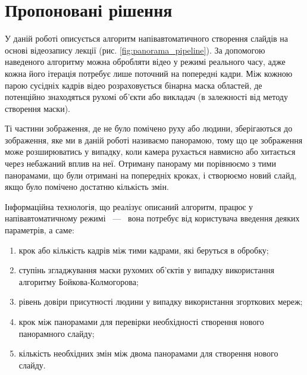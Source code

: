 \section{Пропоновані рішення}

У даній роботі описується алгоритм напівавтоматичного
створення слайдів на основі відеозапису лекції (рис. \ref{fig:panorama_pipeline}).
За допомогою наведеного алгоритму можна обробляти відео
у режимі реального часу, адже кожна його ітерація потребує
лише поточний на попередні кадри. Між кожною парою
сусідніх кадрів відео розраховується бінарна маска областей, де
потенційно знаходяться рухомі об'єкти або викладач
(в залежності від методу створення маски).

Ті частини зображення, де не було помічено руху або людини,
зберігаються до зображення, яке ми в даній роботі називаємо панорамою, тому що
це зображення може розширюватись у випадку, коли камера рухається
навмисно або хитається через небажаний вплив на неї.
Отриману панораму ми порівнюємо з тими панорамами, що були отримані на
попередніх кроках, і створюємо новий слайд, якщо було помічено
достатню кількість змін.

Інформаційна технологія, що реалізує описаний алгоритм, працює у
напівавтоматичному режимі ~---~ вона потребує від користувача введення
деяких параметрів, а саме:
\begin{enumerate}
    \item крок або кількість кадрів між тими кадрами, які беруться в обробку;
    \item ступінь згладжування маски рухомих об'єктів у випадку використання алгоритму Бойкова-Колмогорова;
    \item рівень довіри присутності людини у випадку використання згорткових мереж;
    \item крок між панорамами для перевірки необхідності створення нового панорамного слайду;
    \item кількість необхідних змін між двома панорамами для створення нового слайду.
\end{enumerate}

